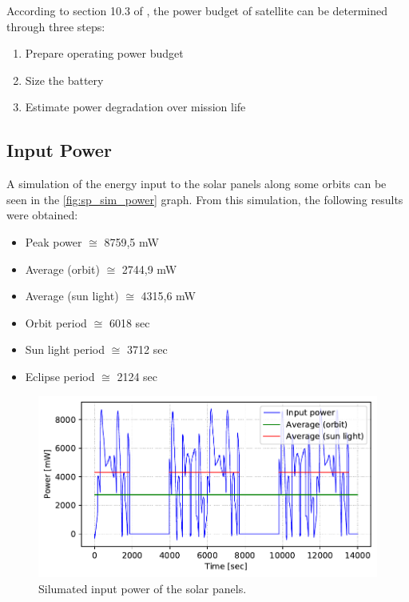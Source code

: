 According to section 10.3 of \cite{larson2005}, the power budget of satellite can be determined through three steps:

\begin{enumerate}
    \item Prepare operating power budget
    \item Size the battery
    \item Estimate power degradation over mission life
\end{enumerate}

\subsection{Input Power}

A simulation of the energy input to the solar panels along some orbits can be seen in the \autoref{fig:sp_sim_power} graph. From this simulation, the following results were obtained:

\begin{itemize}
    \item Peak power $\cong$ 8759,5 mW
    \item Average (orbit) $\cong$ 2744,9 mW
    \item Average (sun light) $\cong$ 4315,6 mW
    \item Orbit period $\cong$ 6018 sec
    \item Sun light period $\cong$ 3712 sec
    \item Eclipse period $\cong$ 2124 sec
\end{itemize}

\begin{figure}[!ht]
    \begin{center}
        \includegraphics[width=\textwidth]{curves/sp_sim_power}
        \caption{Silumated input power of the solar panels.}
        \label{fig:sp_sim_power}
    \end{center}
\end{figure}

